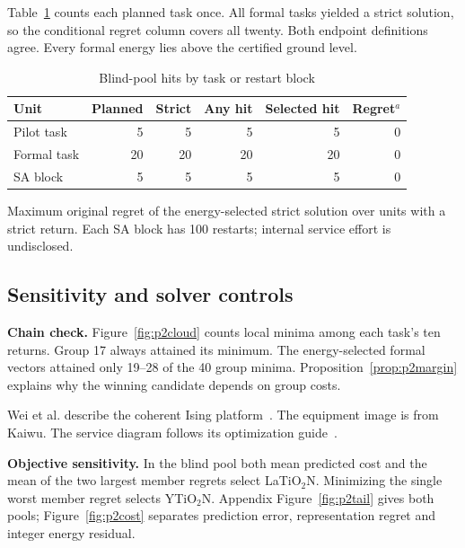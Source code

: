 Table~\ref{tab:p2service} counts each planned task once. All formal tasks yielded a strict solution, so the conditional regret column covers all twenty. Both endpoint definitions agree. Every formal energy lies above the certified ground level.
\begin{table}[!htb]
\centering
\caption{Blind-pool hits by task or restart block}\label{tab:p2service}
\begin{threeparttable}
\begin{tabular}{@{}lrrrrr@{}}
\toprule
Unit & Planned & Strict & Any hit & Selected hit & Regret$^{a}$\\
\midrule
Pilot task & 5 & 5 & 5 & 5 & 0\\
Formal task & 20 & 20 & 20 & 20 & 0\\
SA block & 5 & 5 & 5 & 5 & 0\\
\bottomrule
\end{tabular}
\begin{tablenotes}[flushleft]\footnotesize
\item[$a$] Maximum original regret of the energy-selected strict solution over units with a strict return. Each SA block has 100 restarts; internal service effort is undisclosed.
\end{tablenotes}
\end{threeparttable}
\end{table}
\FloatBarrier

\subsection{Sensitivity and solver controls}\label{sec:p2checks}
\textbf{Chain check.} Figure~\ref{fig:p2cloud} counts local minima among each task's ten returns. Group 17 always attained its minimum. The energy-selected formal vectors attained only 19--28 of the 40 group minima. Proposition~\ref{prop:p2margin} explains why the winning candidate depends on group costs.

Wei et al. describe the coherent Ising platform~\cite{wei2026}. The equipment image is from Kaiwu. The service diagram follows its optimization guide~\cite{kaiwu144}.

\textbf{Objective sensitivity.} In the blind pool both mean predicted cost and the mean of the two largest member regrets select LaTiO$_2$N. Minimizing the single worst member regret selects YTiO$_2$N. Appendix Figure~\ref{fig:p2tail} gives both pools; Figure~\ref{fig:p2cost} separates prediction error, representation regret and integer energy residual.

